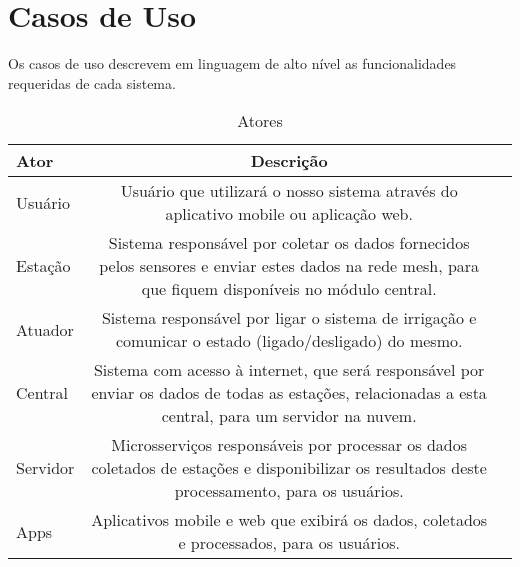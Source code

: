     \section{Casos de Uso}
    
    Os casos de uso descrevem em linguagem de alto nível as funcionalidades requeridas de cada sistema.

    \begin{table}[H]
        \begin{center}
          \caption{Atores}
          \label{tab:Atores}
          \begin{tabular}{l|c|r} %
            \textbf{Ator} & \textbf{Descrição}\\
            \hline
            Usuário & Usuário que utilizará o nosso sistema através do aplicativo mobile ou aplicação web.\\
            Estação & Sistema responsável por coletar os dados fornecidos pelos sensores e enviar estes dados na rede mesh, para que fiquem disponíveis no módulo central.\\
            Atuador & Sistema responsável por ligar o sistema de irrigação e comunicar o estado (ligado/desligado) do mesmo.\\
            Central & Sistema com acesso à internet, que será responsável por enviar os dados de todas as estações, relacionadas a esta central, para um servidor na nuvem.\\
            Servidor & Microsserviços responsáveis por processar os dados coletados de estações e disponibilizar os resultados deste processamento, para os usuários.\\
            Apps & Aplicativos mobile e web que exibirá os dados, coletados e processados, para os usuários.\\
          \end{tabular}
        \end{center}
      \end{table}

